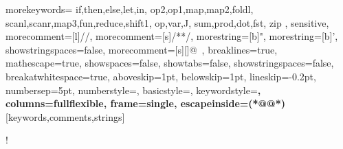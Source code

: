 \usepackage{amsmath}
\usepackage{mathtools}
\usepackage{suffix}
\usepackage{tikz-cd}
\usepackage{mathpartir}
\usepackage{enumitem}
\usepackage{stmaryrd}
\usepackage[all]{xy}
\usepackage{twoopt}
\usepackage{array}
\usepackage{listings}

%
{morekeywords={
  if,then,else,let,in,
  op2,op1,map,map2,foldl,
  scanl,scanr,map3,fun,reduce,shift1,
  op,var,J,
  sum,prod,dot,fst,
  zip
  },%
  sensitive,%
  morecomment=[l]//,%
  morecomment=[s]{/*}{*/},%
  morestring=[b]",%
  morestring=[b]',%
  showstringspaces=false,%
  morecomment=[s][\color{gray}]{@}{\ },%
    breaklines=true,%
  mathescape=true,%
showspaces=false,
showtabs=false,
showstringspaces=false,
breakatwhitespace=true,
  aboveskip=1pt,
  belowskip=1pt,
  lineskip=-0.2pt,
   numbersep=5pt,
   numberstyle=\tiny\ttfamily,
   basicstyle=\small\ttfamily,
   keywordstyle=\bfseries\color{blue!70!black},%
   columns=fullflexible,
  frame=single,
  escapeinside={(*@}{@*)}
}[keywords,comments,strings]%

\lstset{language=llql}
\lstMakeShortInline[columns=fixed]!


\newcommand{\system}{RAD\xspace}
\newcommand{\dfsmooth}{$\text{d}\widetilde{\textsc{f}}$\xspace}
\newcommand{\supfull}{\CIRCLE}
\newcommand{\suphalf}{\LEFTcircle}
\newcommand{\supnone}{\Circle}
\newcommand{\supfullstar}{\hspace{1ex}\supfull*}
\newcommand{\notexists}{-}
\newcommand{\RR}{\mathbb{R}}

\newtheorem{notation}{Notation}
\newtheorem{remark}{Remark}

\usepackage{todonotes}
\newcommand{\TODO}[1]{\todo[inline,author=TODO]{#1}}
\newcommand{\AS}[1]{\todo[inline,author=AS]{#1}}
\newcommand{\as}[1]{\todo[size=\tiny]{as: #1}{}}
\newcommand{\SSS}[1]{\todo[inline,author=SS]{#1}}
\newcommand{\sss}[1]{\todo[size=\tiny]{ss: #1}{}}
\newcommand{\EA}[1]{\todo[inline,author=EA]{#1}}
\newcommand{\ea}[1]{\todo[size=\tiny]{ea: #1}{}}
\newcommand{\MH}[1]{\todo[inline,author=MH]{#1}}
\newcommand{\mh}[1]{\todo[size=\tiny]{mh: #1}{}}

\newcommand{\code}[1]{\texttt{#1}}

\newcommand{\dif}{\mathop{}\!\mathrm{d}}
\newcommand{\Diff}{\mathbf{Diff}}
\newcommand{\sem}[1]{\llbracket #1\rrbracket}
\newcommand{\semgl}[1]{\llparenthesis #1\rrparenthesis}
\newcommand{\defeq}{\stackrel {\mathrm{def}}=}

\makeatletter
\newcommand\@TyAlph[1]{%
\ifcase #1\or \tau\or \sigma\or \rho\else \@ctrerr \fi%
}
\newcommand\ty[1][1]{{\@TyAlph{#1}}}

